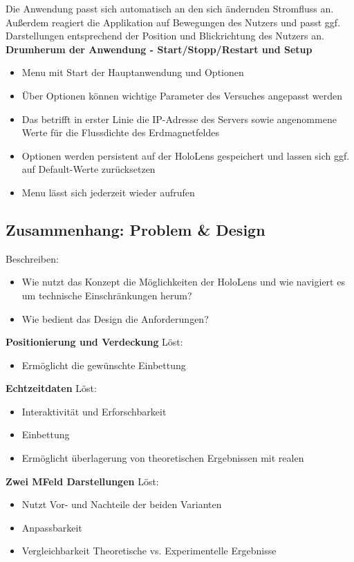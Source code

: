 Die Anwendung passt sich automatisch an den sich ändernden Stromfluss an. Außerdem reagiert die Applikation auf Bewegungen des Nutzers und passt ggf. Darstellungen entsprechend der Position und Blickrichtung des Nutzers an.\\[4px]

\textbf{Drumherum der Anwendung - Start/Stopp/Restart und Setup}
\begin{itemize}[topsep=-2px]
	\setlength{\itemsep}{-5pt}
	\item Menu mit Start der Hauptanwendung und Optionen
	\item Über Optionen können wichtige Parameter des Versuches angepasst werden
	\item Das betrifft in erster Linie die IP-Adresse des Servers sowie angenommene Werte für die Flussdichte des Erdmagnetfeldes
	\item Optionen werden persistent auf der HoloLens gespeichert und lassen sich ggf. auf Default-Werte zurücksetzen
	\item Menu lässt sich jederzeit wieder aufrufen
\end{itemize}

\subsection{Zusammenhang: Problem \& Design}
Beschreiben: 
\begin{itemize}
	\item Wie nutzt das Konzept die Möglichkeiten der HoloLens und wie navigiert es um technische Einschränkungen herum?
	\item Wie bedient das Design die Anforderungen?
\end{itemize}

\textbf{Positionierung und Verdeckung}
Löst:
\begin{itemize}
	\item Ermöglicht die gewünschte Einbettung
\end{itemize}

\textbf{Echtzeitdaten}
Löst:
\begin{itemize}
	\item Interaktivität und Erforschbarkeit
	\item Einbettung
	\item Ermöglicht überlagerung von theoretischen Ergebnissen mit realen
\end{itemize}

\textbf{Zwei MFeld Darstellungen}
Löst: 
\begin{itemize}
	\item Nutzt Vor- und Nachteile der beiden Varianten
	\item Anpassbarkeit
	\item Vergleichbarkeit Theoretische vs. Experimentelle Ergebnisse
\end{itemize}

